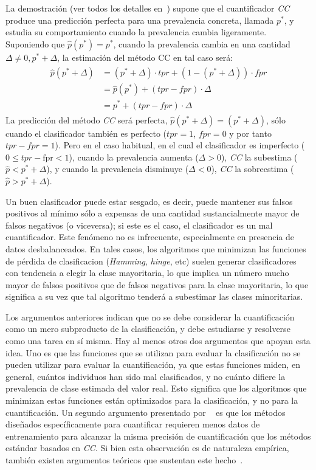 La demostración (ver todos los detalles en~\citep[p.170]{forman2008quantifying})
supone que el cuantificador {\it CC\/} produce una predicción perfecta para una
prevalencia concreta, llamada $p^*$, y estudia su comportamiento cuando la
prevalencia cambia ligeramente. Suponiendo que $\hat p(p^*) = p^*$, cuando la
prevalencia cambia en una cantidad $\Delta \neq 0, p^* + \Delta$, la estimación
del método CC en tal caso será:
\begin{align}
\begin{split}
    \hat p(p^* + \Delta) &= (p^* + \Delta) \cdot {tpr} + (1-(p^* + \Delta)) \cdot {fpr} \\
    &= \hat p(p^*) + ({tpr} - {fpr}) \cdot \Delta \\
    &= p^* + ({tpr} - {fpr}) \cdot \Delta
\end{split}
\end{align}
La predicción del método {\it CC\/} será perfecta, $\hat p(p^* + \Delta) = (p^*
+ \Delta)$, sólo cuando el clasificador también es perfecto (${tpr} = 1$, ${fpr}
= 0$ y por tanto ${tpr} - {fpr} = 1$). Pero en el caso habitual, en el cual el
clasificador es imperfecto ($0 \leq {tpr} - \text {fpr} < 1$), cuando la
prevalencia aumenta ($\Delta > 0$), {\it CC\/} la subestima ($\hat p < p^* +
\Delta $), y cuando la prevalencia disminuye ($\Delta < 0$), {\it CC\/} la
sobreestima ($\hat p > p^* + \Delta $).

Un buen clasificador puede estar sesgado, es decir, puede mantener sus falsos
positivos al mínimo sólo a expensas de una cantidad sustancialmente mayor de
falsos negativos (o viceversa); si este es el caso, el clasificador es un mal
cuantificador. Este fenómeno no es infrecuente, especialmente en presencia de
datos desbalanceados. En tales casos, los algoritmos que minimizan las funciones
de pérdida de clasificacion ({\it Hamming}, {\it hinge}, etc) suelen generar
clasificadores con tendencia a elegir la clase mayoritaria, lo que implica un
número mucho mayor de falsos positivos que de falsos negativos para la clase
mayoritaria, lo que significa a su vez que tal algoritmo tenderá a subestimar
las clases minoritarias.

Los argumentos anteriores indican que no se debe considerar la cuantificación
como un mero subproducto de la clasificación, y debe estudiarse y resolverse
como una tarea en sí misma. Hay al menos otros dos argumentos que apoyan esta
idea. Uno es que las funciones que se utilizan para evaluar la clasificación no
se pueden utilizar para evaluar la cuantificación, ya que estas funciones miden,
en general, cuántos individuos han sido mal clasificados, y no cuánto difiere la
prevalencia de clase estimada del valor real. Esto significa que los algoritmos
que minimizan estas funciones están optimizados para la clasificación, y no para
la cuantificación. Un segundo argumento presentado por
~\citet{forman2008quantifying} es que los métodos diseñados específicamente para
cuantificar requieren menos datos de entrenamiento para alcanzar la misma
precisión de cuantificación que los métodos estándar basados en {\it CC}. Si
bien esta observación es de naturaleza empírica, también existen argumentos
teóricos que sustentan este hecho~\cite{vapnik1999overview}.

